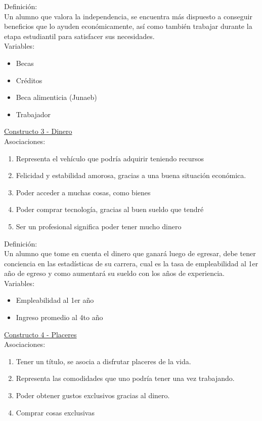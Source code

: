 Definición:\\

Un alumno que valora la independencia, se encuentra más dispuesto a conseguir beneficios que lo ayuden económicamente, así como también trabajar durante la etapa estudiantil para satisfacer sus necesidades.\\

Variables:\\
\begin{itemize}
	\item Becas
	\item Créditos
	\item Beca alimenticia (Junaeb)
	\item Trabajador
\end{itemize}

\underline {Constructo 3 - Dinero} \\
Asociaciones:
\begin{enumerate}
	\item Representa el vehículo que podría adquirir teniendo recursos
	\item Felicidad y estabilidad amorosa, gracias a una buena situación económica.
	\item Poder acceder a muchas cosas, como bienes
	\item Poder comprar tecnología, gracias al buen sueldo que tendré
	\item Ser un profesional significa poder tener mucho dinero
\end{enumerate}

Definición:\\

Un alumno que tome en cuenta el dinero que ganará luego de egresar, debe tener conciencia en las estadísticas de su carrera, cual es la tasa de empleabilidad al 1er año de egreso y como aumentará su sueldo con los años de experiencia.\\

Variables:\\
\begin{itemize}
	\item Empleabilidad al 1er año
	\item Ingreso promedio al 4to año	
\end{itemize} 

\underline {Constructo 4 - Placeres} \\
Asociaciones:
\begin{enumerate}
	\item Tener un título, se asocia a disfrutar placeres de la vida.
	\item Representa las comodidades que uno podría tener una vez trabajando.	
	\item Poder obtener gustos exclusivos gracias al dinero.
	\item Comprar cosas exclusivas
\end{enumerate}

